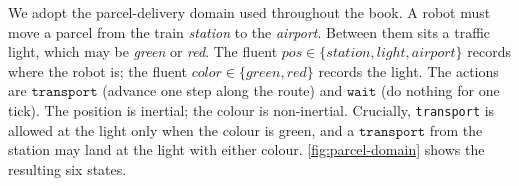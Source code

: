 \begin{example}
\label{ex:parcel-traffic}
We adopt the parcel-delivery domain used throughout the book.  A robot
must move a parcel from the train \emph{station} to the \emph{airport}.
Between them sits a traffic light, which may be \emph{green} or
\emph{red}.  The fluent $\mathit{pos}\in\{\mathit{station},\mathit{light},\mathit{airport}\}$
records where the robot is; the fluent $\mathit{color}\in\{\mathit{green},\mathit{red}\}$
records the light.  The actions are $\texttt{transport}$ (advance one
step along the route) and $\texttt{wait}$ (do nothing for one tick).
The position is inertial; the colour is non-inertial.  Crucially,
\texttt{transport} is allowed at the light only when the colour is
green, and a $\texttt{transport}$ from the station may land at the light
with either colour.  \cref{fig:parcel-domain} shows the resulting six
states.
\end{example}

